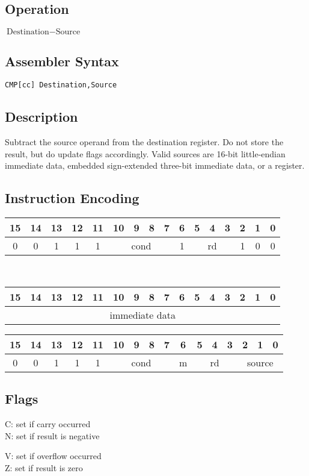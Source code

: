 \documentclass[11pt]{book}
\newcommand*{\encoding}[1]{\noindent
\begin{tabular}{|c|c|c|c|c|c|c|c|c|c|c|c|c|c|c|c|}
\multicolumn{1}{c}{15}&
\multicolumn{1}{c}{14}&
\multicolumn{1}{c}{13}&
\multicolumn{1}{c}{12}&
\multicolumn{1}{c}{11}&
\multicolumn{1}{c}{10}&
\multicolumn{1}{c}{9}&
\multicolumn{1}{c}{8}&
\multicolumn{1}{c}{7}&
\multicolumn{1}{c}{6}&
\multicolumn{1}{c}{5}&
\multicolumn{1}{c}{4}&
\multicolumn{1}{c}{3}&
\multicolumn{1}{c}{2}&
\multicolumn{1}{c}{1}&
\multicolumn{1}{c}{0}\\\hline
#1\\\hline
\end{tabular}}
\newcommand*{\instruction}[2][]{%
  \clearpage
  \thispagestyle{fancy}%
  \fancyhf[HL,HR]{\huge{#2}}%
  \fancyhf[HC]{#1}\addtocounter{section}{1}\noindent
}
\begin{document}

\instruction[Compare]{CMP}
\subsection*{Operation}
\(\text{Destination}-\text{Source}\)

\subsection*{Assembler Syntax}
\texttt{CMP[cc] Destination,Source}

\subsection*{Description}
Subtract the source operand from the destination register.
Do not store the result, but do update flags accordingly.
Valid sources are 16-bit little-endian immediate data,
embedded sign-extended three-bit immediate data,
or a register.

\subsection*{Instruction Encoding}
\encoding{0&0&1&1&1%
&\multicolumn{4}{|c|}{cond}%
&1&\multicolumn{3}{|c|}{rd}&1&0&0}\\\null\qquad
\encoding{\multicolumn{16}{|c|}{immediate data}}

\vspace{2\baselineskip}
\encoding{0&0&1&1&1%
&\multicolumn{4}{|c|}{cond}%
&m&\multicolumn{3}{|c|}{rd}&\multicolumn{3}{|c|}{source}}

\subsection*{Flags}
\begin{multicols}{2}\noindent
  C: set if carry occurred\\
  N: set if result is negative

  \columnbreak\noindent
  V: set if overflow occurred\\
  Z: set if result is zero
\end{multicols}
\end{document}
